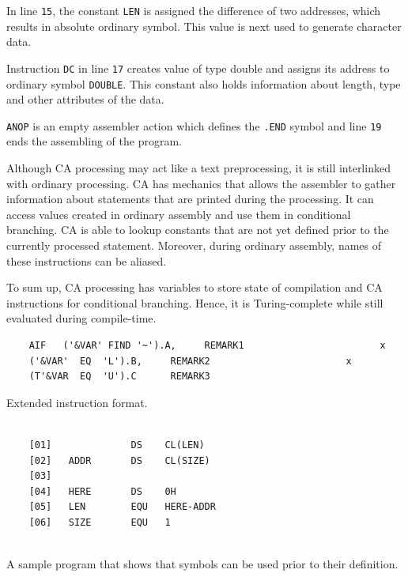In line \verb|15|, the constant \verb|LEN| is assigned the difference of two addresses, which results in absolute ordinary symbol. This value is next used to generate character data.

Instruction \verb|DC| in line \verb|17| creates value of type double and assigns its address to ordinary symbol \verb|DOUBLE|. This constant also holds information about length, type and other attributes of the data.  

\verb|ANOP| is an empty assembler action which defines the \verb|.END| symbol and line \verb|19| ends the assembling of the program. 

\vspace{5mm}

Although CA processing may act like a text preprocessing, it is still interlinked with ordinary processing. CA has mechanics that allows the assembler to gather information about statements that are printed during the processing. It can access values created in ordinary assembly and use them in conditional branching. CA is able to lookup constants that are not yet defined prior to the currently processed statement. Moreover, during ordinary assembly, names of these instructions can be aliased.

To sum up, CA processing has variables to store state of compilation and CA instructions for conditional branching. Hence, it is Turing-complete while still evaluated during compile-time.


\begin{listing}[p]
	\begin{verbatim}
	AIF   ('&VAR' FIND '~').A,     REMARK1                        x
	('&VAR'  EQ  'L').B,     REMARK2                        x
	(T'&VAR  EQ  'U').C      REMARK3 
	\end{verbatim}
	\caption{Extended instruction format.}
	\label{lst:extended}
\end{listing}

\begin{listing}[p]
	\begin{verbatim}
	
	[01]              DS    CL(LEN)
	[02]   ADDR       DS    CL(SIZE)
	[03]
	[04]   HERE       DS    0H
	[05]   LEN        EQU   HERE-ADDR
	[06]   SIZE       EQU   1
	
	\end{verbatim}
	\caption{A sample program that shows that symbols can be used prior to their definition.}
	\label{lst:ordinary_assembly}
\end{listing}

